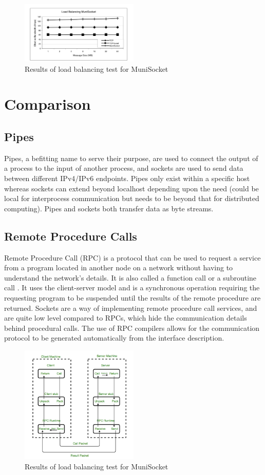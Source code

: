 \documentclass[conference, 12pt]{IEEEtran}
\begin{document}
\begin{figure}[htbp]
    \centering
    \centerline{\includegraphics[width=0.5\textwidth]{Figure7.png}}
    \caption{Results of load balancing test for MuniSocket \cite{mohamed2002user}}
    \label{Figure7}
\end{figure}

\section{Comparison}
\subsection{Pipes}
Pipes, a befitting name to serve their purpose, are used to connect the output of a process to the input of another process, and sockets are used to send data between different IPv4/IPv6 endpoints. Pipes only exist within a specific host whereas sockets can extend beyond localhost depending upon the need (could be local for interprocess communication but needs to be beyond that for distributed computing). Pipes and sockets both transfer data as byte streams.

\subsection{Remote Procedure Calls}
Remote Procedure Call (RPC) is a protocol that can be used to request a service from a program located in another node on a network without having to understand the network’s details. It is also called a function call or a subroutine call \cite{techtarget_2016}. It uses the client-server model and is a synchronous operation requiring the requesting program to be suspended until the results of the remote procedure are returned. Sockets are a way of implementing remote procedure call services, and are quite low level compared to RPCs, which hide the communication details behind procedural calls. The use of RPC compilers allows for the communication protocol to be generated automatically from the interface description.

\begin{figure}[H]
    \centering
    \centerline{\includegraphics[width=0.5\textwidth]{Figure8.png}}
    \caption{Results of load balancing test for MuniSocket \cite{mohamed2002user}}
    \label{Figure8}
\end{figure}



\end{document}
